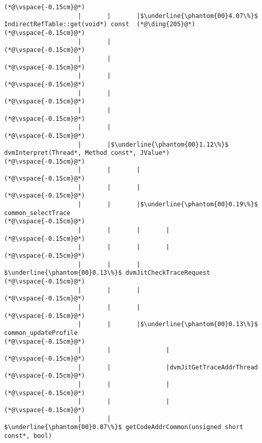 \begin{lstlisting}[caption=Metodikutsu C$\to$Java 20 viiteparametrilla, label=profile:C2JBenchmark00206, numberbychapter=true, frame=lines, float, floatplacement=t]
(*@\vspace{-0.15cm}@*)
                    |       |       |$\underline{\phantom{00}4.07\%}$ IndirectRefTable::get(void*) const  (*@\ding{205}@*)
(*@\vspace{-0.15cm}@*)
                    |       |
(*@\vspace{-0.15cm}@*)
                    |       |
(*@\vspace{-0.15cm}@*)
                    |       |
(*@\vspace{-0.15cm}@*)
                    |       |
(*@\vspace{-0.15cm}@*)
                    |       |
(*@\vspace{-0.15cm}@*)
                    |       |
(*@\vspace{-0.15cm}@*)
                    |       |$\underline{\phantom{00}1.12\%}$ dvmInterpret(Thread*, Method const*, JValue*)
(*@\vspace{-0.15cm}@*)
                    |       |       |
(*@\vspace{-0.15cm}@*)
                    |       |       |
(*@\vspace{-0.15cm}@*)
                    |       |       |$\underline{\phantom{00}0.19\%}$ common_selectTrace
(*@\vspace{-0.15cm}@*)
                    |       |       |       |
(*@\vspace{-0.15cm}@*)
                    |       |       |       |
(*@\vspace{-0.15cm}@*)
                    |       |       |        $\underline{\phantom{00}0.13\%}$ dvmJitCheckTraceRequest
(*@\vspace{-0.15cm}@*)
                    |       |       |
(*@\vspace{-0.15cm}@*)
                    |       |       |
(*@\vspace{-0.15cm}@*)
                    |       |       |$\underline{\phantom{00}0.13\%}$    common_updateProfile
(*@\vspace{-0.15cm}@*)
                    |       |               |
(*@\vspace{-0.15cm}@*)
                    |       |               |dvmJitGetTraceAddrThread
(*@\vspace{-0.15cm}@*)
                    |       |               |
(*@\vspace{-0.15cm}@*)
                    |       |               |
(*@\vspace{-0.15cm}@*)
                    |       |                $\underline{\phantom{00}0.07\%}$ getCodeAddrCommon(unsigned short const*, bool)

\end{lstlisting}

